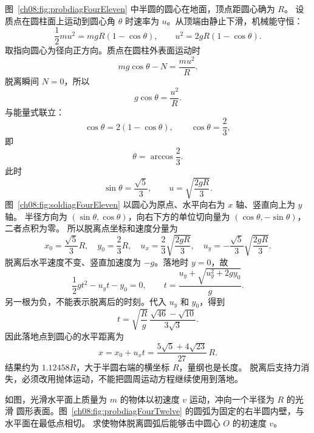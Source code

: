 {\begin{xesolution}
图~\ref{ch08:fig:probdiagFourEleven} 中半圆的圆心在地面，顶点距圆心确为 $R$。
设质点在圆柱面上运动到圆心角 $\theta$ 时速率为 $u$。从顶端由静止下滑，机械能守恒：
\[
 \frac12mu^2=mgR(1-\cos\theta),
 \qquad
 u^2=2gR(1-\cos\theta).
\]
取指向圆心为径向正方向。质点在圆柱外表面运动时
\[
 mg\cos\theta-N=\frac{mu^2}{R}.
\]
脱离瞬间 $N=0$，所以
\[
 g\cos\theta=\frac{u^2}{R}.
\]
与能量式联立：
\[
 \cos\theta=2(1-\cos\theta),
 \qquad
 \boxed{\cos\theta=\frac23},
\]
即
\[
 \boxed{\theta=\arccos\frac23}.
\]
此时
\[
 \sin\theta=\frac{\sqrt5}{3},
 \qquad
 u=\sqrt{\frac{2gR}{3}}.
\]
\soldiagFourEleven
图~\ref{ch08:fig:soldiagFourEleven} 以圆心为原点、水平向右为 $x$ 轴、竖直向上为 $y$ 轴。
半径方向为 $(\sin\theta,\cos\theta)$，向右下方的单位切向量为 $(\cos\theta,-\sin\theta)$，二者点积为零。
所以脱离点坐标和速度分量为
\[
 x_0=\frac{\sqrt5}{3}R,\quad
 y_0=\frac23R,\quad
 u_x=\frac23\sqrt{\frac{2gR}{3}},\quad
 u_y=-\frac{\sqrt5}{3}\sqrt{\frac{2gR}{3}}.
\]
脱离后水平速度不变、竖直加速度为 $-g$。落地时 $y=0$，故
\[
 \frac12gt^2-u_yt-y_0=0,\qquad t=\frac{u_y+\sqrt{u_y^2+2gy_0}}{g}.
\]
另一根为负，不能表示脱离后的时刻。代入 $u_y$ 和 $y_0$，得到
\[
 t=\sqrt{\frac{R}{g}}\,
 \frac{\sqrt{46}-\sqrt{10}}{3\sqrt3}.
\]
因此落地点到圆心的水平距离为
\[
 \boxed{
 x=x_0+u_xt
 =\frac{5\sqrt5+4\sqrt{23}}{27}\,R}.
\]
结果约为 $1.12458R$，大于半圆右端的横坐标 $R$，量纲也是长度。
脱离后支持力消失，必须改用抛体运动，不能把圆周运动方程继续使用到落地。
\end{xesolution}

\begin{origexamplebox}{}\label{ch08:ex:s11-4-12}
如图，光滑水平面上质量为 $m$ 的物体以初速度 $v$ 运动，冲向一个半径为 $R$ 的光滑
圆形表面。图~\ref{ch08:fig:probdiagFourTwelve} 的圆弧为固定的右半圆内壁，与水平面在最低点相切。
求使物体脱离圆弧后能够击中圆心 $O$ 的初速度 $v$。
\probdiagFourTwelve
\end{origexamplebox}

}
